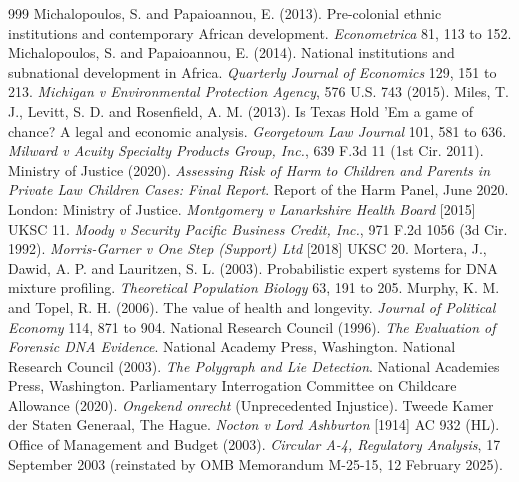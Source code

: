 \begin{thebibliography}{999}
 Michalopoulos, S. and Papaioannou, E. (2013). Pre-colonial ethnic institutions and contemporary African development. \emph{Econometrica} 81, 113 to 152.
 Michalopoulos, S. and Papaioannou, E. (2014). National institutions and subnational development in Africa. \emph{Quarterly Journal of Economics} 129, 151 to 213.
 \emph{Michigan v Environmental Protection Agency}, 576 U.S. 743 (2015).
 Miles, T. J., Levitt, S. D. and Rosenfield, A. M. (2013). Is Texas Hold 'Em a game of chance? A legal and economic analysis. \emph{Georgetown Law Journal} 101, 581 to 636.
 \emph{Milward v Acuity Specialty Products Group, Inc.}, 639 F.3d 11 (1st Cir. 2011).
 Ministry of Justice (2020). \emph{Assessing Risk of Harm to Children and Parents in Private Law Children Cases: Final Report}. Report of the Harm Panel, June 2020. London: Ministry of Justice.
 \emph{Montgomery v Lanarkshire Health Board} [2015] UKSC 11.
 \emph{Moody v Security Pacific Business Credit, Inc.}, 971 F.2d 1056 (3d Cir. 1992).
 \emph{Morris-Garner v One Step (Support) Ltd} [2018] UKSC 20.
 Mortera, J., Dawid, A. P. and Lauritzen, S. L. (2003). Probabilistic expert systems for DNA mixture profiling. \emph{Theoretical Population Biology} 63, 191 to 205.
 Murphy, K. M. and Topel, R. H. (2006). The value of health and longevity. \emph{Journal of Political Economy} 114, 871 to 904.
 National Research Council (1996). \emph{The Evaluation of Forensic DNA Evidence}. National Academy Press, Washington.
 National Research Council (2003). \emph{The Polygraph and Lie Detection}. National Academies Press, Washington.
 Parliamentary Interrogation Committee on Childcare Allowance (2020). \emph{Ongekend onrecht} (Unprecedented Injustice). Tweede Kamer der Staten Generaal, The Hague.
 \emph{Nocton v Lord Ashburton} [1914] AC 932 (HL).
 Office of Management and Budget (2003). \emph{Circular A-4, Regulatory Analysis}, 17 September 2003 (reinstated by OMB Memorandum M-25-15, 12 February 2025).

\end{thebibliography}
